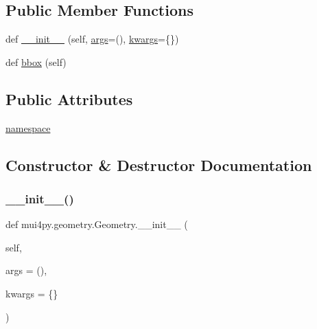 \subsection*{Public Member Functions}
\begin{DoxyCompactItemize}
\item 
def \hyperlink{classmui4py_1_1geometry_1_1_geometry_ab4442f9d6c919cd2822b63b86d3529d6}{\+\_\+\+\_\+init\+\_\+\+\_\+} (self, \hyperlink{classmui4py_1_1common_1_1_cpp_class_a29797823c6e21f22bba24ee7d35ef31d}{args}=(), \hyperlink{classmui4py_1_1common_1_1_cpp_class_af43879f06f07b1abf0d08e30c5ead46f}{kwargs}=\{\})
\item 
def \hyperlink{classmui4py_1_1geometry_1_1_geometry_ad32b8e1fdc5dbc35909ff03f4787df8e}{bbox} (self)
\end{DoxyCompactItemize}
\subsection*{Public Attributes}
\begin{DoxyCompactItemize}
\item 
\hyperlink{classmui4py_1_1geometry_1_1_geometry_a953a13572dab2da3a02d9ce4ff010139}{namespace}
\end{DoxyCompactItemize}


\subsection{Constructor \& Destructor Documentation}
\mbox{\label{classmui4py_1_1geometry_1_1_geometry_ab4442f9d6c919cd2822b63b86d3529d6}} 
\subsubsection{\texorpdfstring{\+\_\+\+\_\+init\+\_\+\+\_\+()}{\_\_init\_\_()}}
{\footnotesize\ttfamily def mui4py.\+geometry.\+Geometry.\+\_\+\+\_\+init\+\_\+\+\_\+ (\begin{DoxyParamCaption}\item[{}]{self,  }\item[{}]{args = {\ttfamily ()},  }\item[{}]{kwargs = {\ttfamily \{\}} }\end{DoxyParamCaption})}



